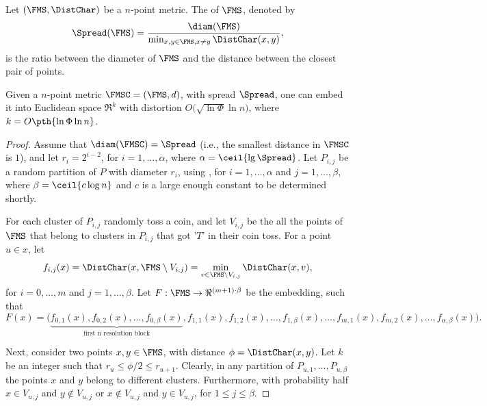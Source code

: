 Let $(\FMS,\DistChar)$ be a $n$-point metric. The  of $\FMS$,
denoted by
\begin{equation*}
    \Spread(\FMS)%
    =%
    \frac{\diam(\FMS)}{\min_{x,y \in \FMS, x \ne y} \DistChar(x,y)},
\end{equation*}
 is the ratio between the diameter of $\FMS$
and the distance between the closest pair of points.

\begin{theorem}
    Given a $n$-point metric $\FMSC = (\FMS,d)$, with spread
    $\Spread$, one can embed it into Euclidean space $\Re^k$ with
    distortion $O\bigl( \sqrt{\ln \Phi} \ln n\bigr)$, where
    $k= O \pth{ \ln \Phi \ln n}$.
\end{theorem}

\begin{proof}
    Assume that $\diam(\FMSC) = \Spread$ (i.e., the smallest distance
    in $\FMSC$ is $1$), and let $r_i = 2^{i-2}$, for $i=1,\ldots,
    \alpha$, where $\alpha=\ceil{\lg \Spread}$.  Let $P_{i,j}$ be a
    random partition of $P$ with diameter $r_i$, using
    , for $i=1,\ldots, \alpha$ and $j=1,\ldots, \beta$,
    where $\beta = \ceil{ c \log n}$ and $c$ is a large enough
    constant to be determined shortly.
    
    For each cluster of $P_{i,j}$ randomly toss a coin, and let
    $V_{i,j}$ be the all the points of $\FMS$ that belong to clusters
    in $P_{i,j}$ that got '$T$' in their coin toss. For a point $u \in
    x$, let
    \begin{equation*}
        f_{i,j}(x)%
        =%
        \DistChar(x, \FMS \setminus V_{i,j})%
        =%
        \min_{v \in \FMS \setminus V_{i,j}} \DistChar(x,v),    
    \end{equation*}
    for $i=0,\ldots, m$
    and $j=1,\ldots, \beta$. Let $F: \FMS \rightarrow \Re^{(m+1) \cdot
       \beta}$ be the embedding, such that
    \begin{equation*}
        F(x)%
        =%
        \bigl(
        \underbrace{f_{0,1}(x), f_{0,2}(x), \ldots,
           f_{0,\beta}(x)}_{\text{first n resolution block}},
        f_{1,1}(x),
        f_{1,2}(x),
        \ldots, f_{1,\beta}(x), \ldots, f_{m,1}(x), f_{m,2}(x), \ldots,
        f_{\alpha,\beta}(x)\bigr).        
    \end{equation*}

    
    Next, consider two points $x,y \in \FMS$, with distance $\phi=
    \DistChar(x,y)$. Let $k$ be an integer such that $r_u \leq \phi/2 \leq
    r_{u+1}$. Clearly, in any partition of $P_{u,1}, \ldots,
    P_{u,\beta}$ the points $x$ and $y$ belong to different clusters.
    Furthermore, with probability half $x \in V_{u,j}$ and $y \notin
    V_{u,j}$ or $x \notin V_{u,j}$ and $y \in
    V_{u,j}$, for $1 \leq j \leq \beta$.
    

\end{proof}
